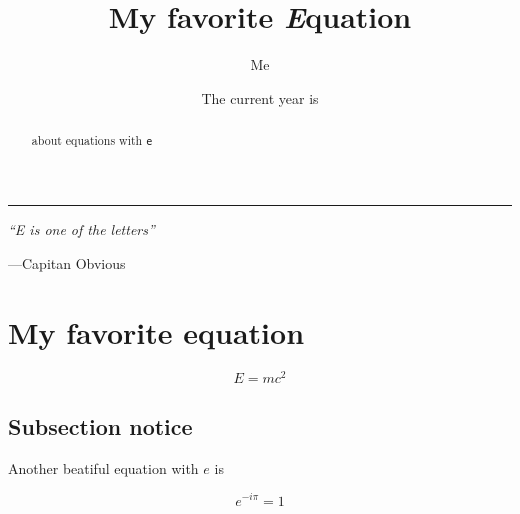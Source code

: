 \documentclass{article}
\title{My favorite \textit{E}quation}
\author{Me}
\date{The current year is \the\year}
\begin{document}
\maketitle

\hrule
\tableofcontents
\newpage
\epigraph{\itshape ``E is one of the letters''}{---Capitan Obvious}


\begin{abstract}
    about equations with \texttt{e}
\end{abstract}
\section{My favorite equation} 
\begin{equation}
E = mc^2
\end{equation}
\subsection*{Subsection notice}
\begin{center}
     Another beatiful equation with $e$ is 
\end{center}

$$
e^{-i\pi}=1
$$
\end{document}
